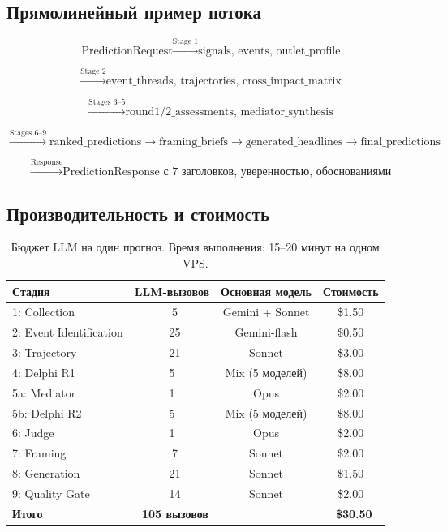 \subsection{Прямолинейный пример потока}

\begin{equation}
\text{PredictionRequest} \xrightarrow{\text{Stage 1}} \text{signals, events, outlet\_profile}
\end{equation}

\begin{equation}
\xrightarrow{\text{Stage 2}} \text{event\_threads, trajectories, cross\_impact\_matrix}
\end{equation}

\begin{equation}
\xrightarrow{\text{Stages 3–5}} \text{round1/2\_assessments, mediator\_synthesis}
\end{equation}

\begin{equation}
\xrightarrow{\text{Stages 6–9}} \text{ranked\_predictions} \to \text{framing\_briefs} \to \text{generated\_headlines} \to \text{final\_predictions}
\end{equation}

\begin{equation}
\xrightarrow{\text{Response}} \text{PredictionResponse} \text{ с 7 заголовков, уверенностью, обоснованиями}
\end{equation}

\subsection{Производительность и стоимость}


\begin{table}[h]
\centering
\begin{tabular}{|l|c|c|c|}
\hline
\textbf{Стадия} & \textbf{LLM-вызовов} & \textbf{Основная модель} & \textbf{Стоимость} \\
\hline
1: Collection & ~5 & Gemini + Sonnet & \$1.50 \\
2: Event Identification & ~25 & Gemini-flash & \$0.50 \\
3: Trajectory & ~21 & Sonnet & \$3.00 \\
4: Delphi R1 & 5 & Mix (5 моделей) & \$8.00 \\
5a: Mediator & 1 & Opus & \$2.00 \\
5b: Delphi R2 & 5 & Mix (5 моделей) & \$8.00 \\
6: Judge & 1 & Opus & \$2.00 \\
7: Framing & ~7 & Sonnet & \$2.00 \\
8: Generation & ~21 & Sonnet & \$1.50 \\
9: Quality Gate & ~14 & Sonnet & \$2.00 \\
\hline
\textbf{Итого} & \textbf{~105 вызовов} & & \textbf{~\$30.50} \\
\hline
\end{tabular}
\caption{Бюджет LLM на один прогноз. Время выполнения: 15–20 минут на одном VPS.}
\label{tab:cost_budget}
\end{table}


